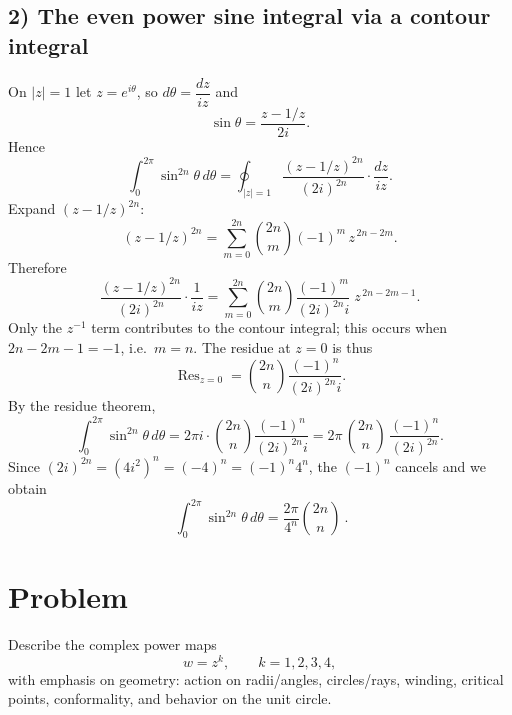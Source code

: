 \documentclass[11pt]{article}
\begin{document}
\subsection*{2) The even power sine integral via a contour integral}
On $|z|=1$ let $z=e^{i\theta}$, so $d\theta=\dfrac{dz}{iz}$ and
\[
\sin\theta=\frac{z-1/z}{2i}.
\]
Hence
\[
\int_{0}^{2\pi}\sin^{2n}\theta\,d\theta
=
\oint_{|z|=1}
\frac{(z-1/z)^{2n}}{(2i)^{2n}}\cdot \frac{dz}{iz}.
\]
Expand $(z-1/z)^{2n}$:
\[
(z-1/z)^{2n}
=\sum_{m=0}^{2n}\binom{2n}{m}(-1)^m\,z^{\,2n-2m}.
\]
Therefore
\[
\frac{(z-1/z)^{2n}}{(2i)^{2n}}\cdot \frac{1}{iz}
=
\sum_{m=0}^{2n}
\binom{2n}{m}\frac{(-1)^m}{(2i)^{2n}i}\;z^{\,2n-2m-1}.
\]
Only the $z^{-1}$ term contributes to the contour integral; this occurs when
$2n-2m-1=-1$, i.e.\ $m=n$. The residue at $z=0$ is thus
\[
\operatorname{Res}_{z=0}
=
\binom{2n}{n}\frac{(-1)^n}{(2i)^{2n}i}.
\]
By the residue theorem,
\[
\int_{0}^{2\pi}\sin^{2n}\theta\,d\theta
=
2\pi i \cdot \binom{2n}{n}\frac{(-1)^n}{(2i)^{2n}i}
=
2\pi\,\binom{2n}{n}\,\frac{(-1)^n}{(2i)^{2n}}.
\]
Since $(2i)^{2n}=(4i^{2})^{n}=(-4)^{n}=(-1)^n4^n$, the $(-1)^n$ cancels and we obtain
\[
\boxed{\ \displaystyle
	\int_{0}^{2\pi}\sin^{2n}\theta\,d\theta
	=
	\frac{2\pi}{4^n}\binom{2n}{n}\ }.
\]

\section*{Problem}
Describe the complex power maps
\[
w=z^{k},\qquad k=1,2,3,4,
\]
with emphasis on geometry: action on radii/angles, circles/rays, winding, critical points,
conformality, and behavior on the unit circle.
\end{document}
